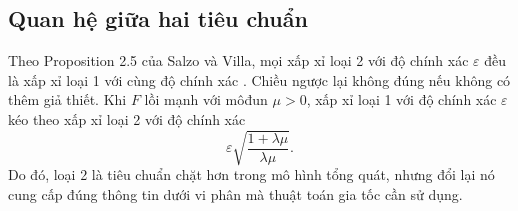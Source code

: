 \subsection{Quan hệ giữa hai tiêu chuẩn}

Theo Proposition 2.5 của Salzo và Villa, mọi xấp xỉ loại 2 với độ chính xác $\varepsilon$ đều là xấp xỉ loại 1 với cùng độ chính xác \cite{salzo2012}. Chiều ngược lại không đúng nếu không có thêm giả thiết. Khi $F$ lồi mạnh với môđun $\mu>0$, xấp xỉ loại 1 với độ chính xác $\varepsilon$ kéo theo xấp xỉ loại 2 với độ chính xác
\[
\varepsilon\sqrt{\frac{1+\lambda\mu}{\lambda\mu}}.
\]
Do đó, loại 2 là tiêu chuẩn chặt hơn trong mô hình tổng quát, nhưng đổi lại nó cung cấp đúng thông tin dưới vi phân mà thuật toán gia tốc cần sử dụng.


